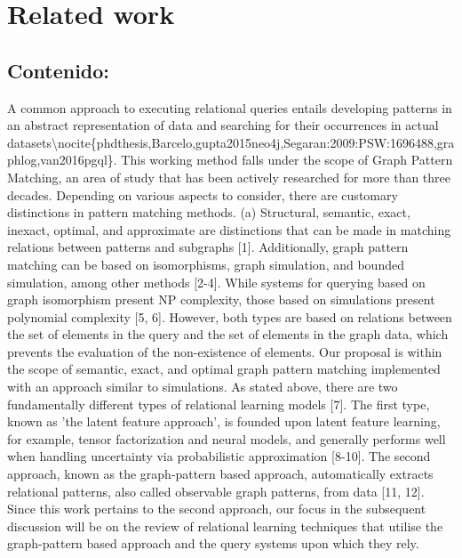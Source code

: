 \documentclass{article}%
\begin{document}
%
\clearpage%
\section{Related work}%
\label{sec:Relatedwork}%
\subsection{Contenido:}%
\label{subsec:Contenido}%
A common approach to executing relational queries entails developing patterns in an abstract representation of data and searching for their occurrences in actual datasets\textbackslash{}nocite\{phdthesis,Barcelo,gupta2015neo4j,Segaran:2009:PSW:1696488,graphlog,van2016pgql\}. This working method falls under the scope of Graph Pattern Matching, an area of study that has been actively researched for more than three decades. Depending on various aspects to consider, there are customary distinctions in pattern matching methods. (a) Structural, semantic, exact, inexact, optimal, and approximate are distinctions that can be made in matching relations between patterns and subgraphs {[}1{]}. Additionally, graph pattern matching can be based on isomorphisms, graph simulation, and bounded simulation, among other methods {[}2{-}4{]}. While systems for querying based on graph isomorphism present NP complexity, those based on simulations present polynomial complexity {[}5, 6{]}. However, both types are based on relations between the set of elements in the query and the set of elements in the graph data, which prevents the evaluation of the non{-}existence of elements. Our proposal is within the scope of semantic, exact, and optimal graph pattern matching implemented with an approach similar to simulations.\newline%
\newline%
As stated above, there are two fundamentally different types of relational learning models {[}7{]}. The first type, known as 'the latent feature approach', is founded upon latent feature learning, for example, tensor factorization and neural models, and generally performs well when handling uncertainty via probabilistic approximation {[}8{-}10{]}. The second approach, known as the graph{-}pattern based approach, automatically extracts relational patterns, also called observable graph patterns, from data {[}11, 12{]}. Since this work pertains to the second approach, our focus in the subsequent discussion will be on the review of relational learning techniques that utilise the graph{-}pattern based approach and the query systems upon which they rely.\newline%
\end{document}

